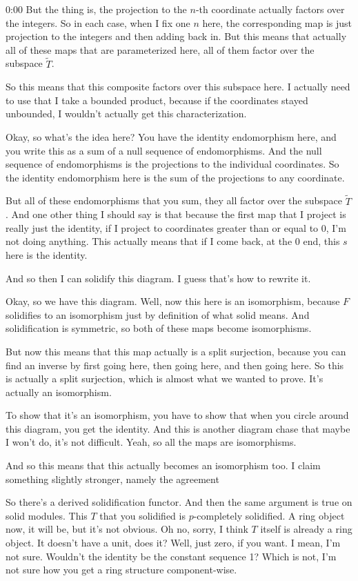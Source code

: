 \begin{unfinished}{0:00}
But the thing is, the projection to the $n$-th coordinate actually factors over the integers. So in each case, when I fix one $n$ here, the corresponding map is just projection to the integers and then adding back in. But this means that actually all of these maps that are parameterized here, all of them factor over the subspace $\tilde{T}$. 

So this means that this composite factors over this subspace here. I actually need to use that I take a bounded product, because if the coordinates stayed unbounded, I wouldn't actually get this characterization.

Okay, so what's the idea here? You have the identity endomorphism here, and you write this as a sum of a null sequence of endomorphisms. And the null sequence of endomorphisms is the projections to the individual coordinates. So the identity endomorphism here is the sum of the projections to any coordinate.

But all of these endomorphisms that you sum, they all factor over the subspace $\tilde{T}$. And one other thing I should say is that because the first map that I project is really just the identity, if I project to coordinates greater than or equal to 0, I'm not doing anything. This actually means that if I come back, at the 0 end, this $s$ here is the identity.

And so then I can solidify this diagram. I guess that's how to rewrite it.

Okay, so we have this diagram. Well, now this here is an isomorphism, because $F$ solidifies to an isomorphism just by definition of what solid means. And solidification is symmetric, so both of these maps become isomorphisms.

But now this means that this map actually is a split surjection, because you can find an inverse by first going here, then going here, and then going here. So this is actually a split surjection, which is almost what we wanted to prove. It's actually an isomorphism.

To show that it's an isomorphism, you have to show that when you circle around this diagram, you get the identity. And this is another diagram chase that maybe I won't do, it's not difficult. Yeah, so all the maps are isomorphisms.

And so this means that this actually becomes an isomorphism too. I claim something slightly stronger, namely the agreement

So there's a derived solidification functor. And then the same argument is true on solid modules. This $T$ that you solidified is $p$-completely solidified. A ring object now, it will be, but it's not obvious. Oh no, sorry, I think $T$ itself is already a ring object. It doesn't have a unit, does it? Well, just zero, if you want. I mean, I'm not sure. Wouldn't the identity be the constant sequence 1? Which is not, I'm not sure how you get a ring structure component-wise.


\end{unfinished}
